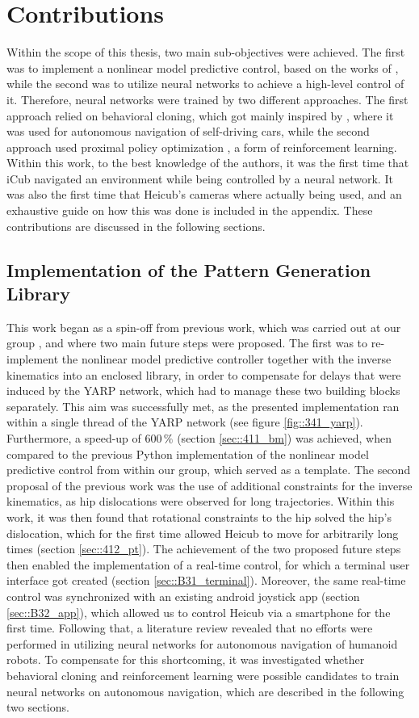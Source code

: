\label{sec::5_co}
\section{Contributions}
Within the scope of this thesis, two main sub-objectives were achieved. The first was to implement a nonlinear model predictive control, based on the works of \cite{stein2017closed}\cite{naveau2016reactive}, while the second was to utilize neural networks to achieve a high-level control of it. Therefore, neural networks were trained by two different approaches. The first approach relied on behavioral cloning, which got mainly inspired by \cite{bojarski2016end}, where it was used for autonomous navigation of self-driving cars, while the second approach used proximal policy optimization \cite{schulman2017proximal}, a form of reinforcement learning.  Within this work, to the best knowledge of the authors, it was the first time that iCub navigated an environment while being controlled by a neural network. It was also the first time that Heicub's cameras where actually being used, and an exhaustive guide on how this was done is included in the appendix. These contributions are discussed in the following sections.
\subsection{Implementation of the Pattern Generation Library}
This work began as a spin-off from previous work, which was carried out at our group \cite{stein2017closed}, and where two main future steps were proposed. The first was to re-implement the nonlinear model predictive controller together with the inverse kinematics into an enclosed library, in order to compensate for delays that were induced by the YARP network, which had to manage these two building blocks separately. This aim was successfully met, as the presented implementation ran within a single thread of the YARP network (see figure \ref{fig::341_yarp}). Furthermore, a speed-up of $600\,\%$ (section \ref{sec::411_bm}) was achieved, when compared to the previous Python implementation of the nonlinear model predictive control from within our group, which served as a template. The second proposal of the previous work was the use of additional constraints for the inverse kinematics, as hip dislocations were observed for long trajectories. Within this work, it was then found that rotational constraints to the hip solved the hip's dislocation, which for the first time allowed Heicub to move for arbitrarily long times (section \ref{sec::412_pt}). The achievement of the two proposed future steps then enabled the implementation of a real-time control, for which a terminal user interface got created (section \ref{sec::B31_terminal}). Moreover, the same real-time control was synchronized with an existing android joystick app (section \ref{sec::B32_app}), which allowed us to control Heicub via a smartphone for the first time. Following that, a literature review revealed that no efforts were performed in utilizing neural networks for autonomous navigation of humanoid robots. To compensate for this shortcoming, it was investigated whether behavioral cloning and reinforcement learning were possible candidates to train neural networks on autonomous navigation, which are described in the following two sections.
